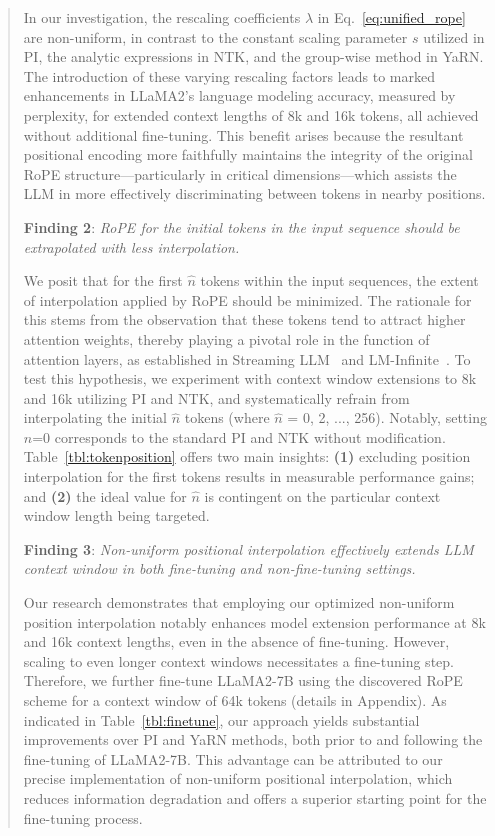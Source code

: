 \begin{abstract}
In our investigation, the rescaling coefficients $\lambda$ in Eq.~\ref{eq:unified_rope} are non-uniform, in contrast to the constant scaling parameter $s$ utilized in PI, the analytic expressions in NTK, and the group-wise method in YaRN. The introduction of these varying rescaling factors leads to marked enhancements in LLaMA2's language modeling accuracy, measured by perplexity, for extended context lengths of 8k and 16k tokens, all achieved without additional fine-tuning. This benefit arises because the resultant positional encoding more faithfully maintains the integrity of the original RoPE structure—particularly in critical dimensions—which assists the LLM in more effectively discriminating between tokens in nearby positions.

\textbf{Finding 2}: \textit{RoPE for the initial tokens in the input sequence should be extrapolated with less interpolation.} 

We posit that for the first $\hat{n}$ tokens within the input sequences, the extent of interpolation applied by RoPE should be minimized. The rationale for this stems from the observation that these tokens tend to attract higher attention weights, thereby playing a pivotal role in the function of attention layers, as established in Streaming LLM~\cite{streamingllm} and LM-Infinite~\cite{han2023lminfinite}. To test this hypothesis, we experiment with context window extensions to 8k and 16k utilizing PI and NTK, and systematically refrain from interpolating the initial $\hat n$ tokens (where $\hat n$ = 0, 2, ..., 256). Notably, setting $\hat n$=0 corresponds to the standard PI and NTK without modification. Table~\ref{tbl:tokenposition} offers two main insights: \textbf{(1)} excluding position interpolation for the first tokens results in measurable performance gains; and \textbf{(2)} the ideal value for $\hat n$ is contingent on the particular context window length being targeted.

\textbf{Finding 3}: \textit{Non-uniform positional interpolation effectively extends LLM context window in both fine-tuning and non-fine-tuning settings.} 

Our research demonstrates that employing our optimized non-uniform position interpolation notably enhances model extension performance at 8k and 16k context lengths, even in the absence of fine-tuning. However, scaling to even longer context windows necessitates a fine-tuning step. Therefore, we further fine-tune LLaMA2-7B using the discovered RoPE scheme for a context window of 64k tokens (details in Appendix). As indicated in Table~\ref{tbl:finetune}, our approach yields substantial improvements over PI and YaRN methods, both prior to and following the fine-tuning of LLaMA2-7B. This advantage can be attributed to our precise implementation of non-uniform positional interpolation, which reduces information degradation and offers a superior starting point for the fine-tuning process.


\end{abstract}
